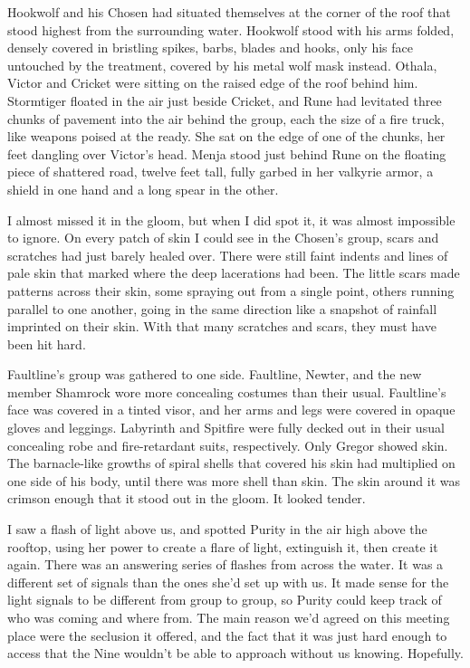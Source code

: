 Hookwolf and his Chosen had situated themselves at the corner of the roof that stood highest from the surrounding water.  Hookwolf stood with his arms folded, densely covered in bristling spikes, barbs, blades and hooks, only his face untouched by the treatment, covered by his metal wolf mask instead.  Othala, Victor and Cricket were sitting on the raised edge of the roof behind him.  Stormtiger floated in the air just beside Cricket, and Rune had levitated three chunks of pavement into the air behind the group, each the size of a fire truck, like weapons poised at the ready.  She sat on the edge of one of the chunks, her feet dangling over Victor's head.  Menja stood just behind Rune on the floating piece of shattered road, twelve feet tall, fully garbed in her valkyrie armor, a shield in one hand and a long spear in the other.



I almost missed it in the gloom, but when I did spot it, it was almost impossible to ignore.  On every patch of skin I could see in the Chosen's group, scars and scratches had just barely healed over.  There were still faint indents and lines of pale skin that marked where the deep lacerations had been.  The little scars made patterns across their skin, some spraying out from a single point, others running parallel to one another, going in the same direction like a snapshot of rainfall imprinted on their skin.  With that many scratches and scars, they must have been hit hard.



Faultline's group was gathered to one side.  Faultline, Newter, and the new member Shamrock wore more concealing costumes than their usual.  Faultline's face was covered in a tinted visor, and her arms and legs were covered in opaque gloves and leggings.  Labyrinth and Spitfire were fully decked out in their usual concealing robe and fire-retardant suits, respectively.  Only Gregor showed skin.  The barnacle-like growths of spiral shells that covered his skin had multiplied on one side of his body, until there was more shell than skin.  The skin around it was crimson enough that it stood out in the gloom.  It looked tender.



I saw a flash of light above us, and spotted Purity in the air high above the rooftop, using her power to create a flare of light, extinguish it, then create it again.  There was an answering series of flashes from across the water.  It was a different set of signals than the ones she'd set up with us.  It made sense for the light signals to be different from group to group, so Purity could keep track of who was coming and where from.  The main reason we'd agreed on this meeting place were the seclusion it offered, and the fact that it was just hard enough to access that the Nine wouldn't be able to approach without us knowing.  Hopefully.



